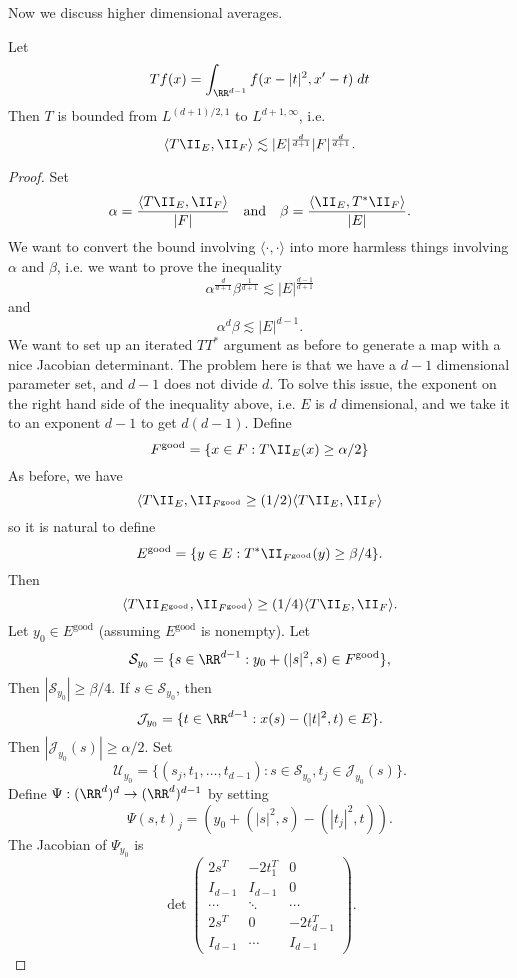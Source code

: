 Now we discuss higher dimensional averages.

\begin{theorem}
    Let
    \[ Tf(x) = \int_{\RR^{d-1}} f(x - |t|^2, x' - t)\; dt \]
    Then $T$ is bounded from $L^{(d+1)/2, 1}$ to $L^{d+1,\infty}$, i.e.
    \[ \langle T \II_E, \II_F \rangle \lesssim |E|^{\frac{d}{d+1}} |F|^{\frac{d}{d+1}}. \]
\end{theorem}
\begin{proof}
    Set
    \[ \alpha = \frac{\langle T\II_E, \II_F \rangle}{|F|} \quad\text{and}\quad \beta = \frac{\langle \II_E, T^* \II_F \rangle}{|E|}. \]
    We want to convert the bound involving $\langle \cdot, \cdot \rangle$ into more harmless things involving $\alpha$ and $\beta$, i.e. we want to prove the inequality
    \[ \alpha^{\frac{d}{d+1}} \beta^{\frac{1}{d+1}} \lesssim |E|^{\frac{d-1}{d+1}} \]
    and
    \[ \alpha^d \beta \lesssim |E|^{d-1}. \]
    We want to set up an iterated $TT^*$ argument as before to generate a map with a nice Jacobian determinant. The problem here is that we have a $d-1$ dimensional parameter set, and $d-1$ does not divide $d$. To solve this issue, the exponent on the right hand side of the inequality above, i.e. $E$ is $d$ dimensional, and we take it to an exponent $d-1$ to get $d(d-1)$. Define
    \[ F^{\text{good}} = \{ x \in F: T \II_E(x) \geq \alpha/2 \} \]
    As before, we have
    \[ \langle T \II_E, \II_{F^{\text{good}}} \geq (1/2) \langle T \II_E, \II_F \rangle \]
    so it is natural to define
    \[ E^{\text{good}} = \{ y \in E: T^* \II_{F^{\text{good}}}(y) \geq \beta / 4 \}. \]
    Then
    \[ \langle T \II_{E^{\text{good}}}, \II_{F^{\text{good}}} \rangle \geq (1/4) \langle T \II_E, \II_F \rangle. \]
    Let $y_0 \in E^{\text{good}}$ (assuming $E^{\text{good}}$ is nonempty). Let
    \[ \mathcal{S}_{y_0} = \{ s \in \RR^{d-1}: y_0 + (|s|^2, s) \in F^{\text{good}} \}, \]
    Then $|\mathcal{S}_{y_0}| \geq \beta / 4$. If $s \in \mathcal{S}_{y_0}$, then
    \[ \mathcal{J}_{y_0} = \{ t \in \RR^{d-1}: x(s) - (|t|^2,t) \in E \}. \]
    Then $|\mathcal{J}_{y_0}(s)| \geq \alpha/2$. Set
    \[ \mathcal{U}_{y_0} = \{ (s_j, t_1,\dots,t_{d-1}) : s \in \mathcal{S}_{y_0}, t_j \in \mathcal{J}_{y_0}(s) \}. \]
    Define $\Psi: (\RR^d)^d \to (\RR^d)^{d-1}$ by setting
    \[ \Psi(s,t)_j = (y_0 + (|s|^2,s) - (|t_j|^2,t)). \]
    The Jacobian of $\Psi_{y_0}$ is
    \[ \det \begin{pmatrix} 2s^T & -2t_1^T & 0 \\ I_{d-1} & I_{d-1} & 0 \\ \cdots & \ddots & \cdots \\ 2s^T & 0 & -2t_{d-1}^T \\ I_{d-1} & \cdots & I_{d-1} \end{pmatrix}. \]

\end{proof}
